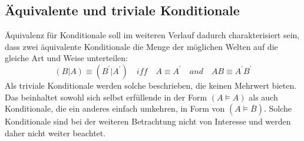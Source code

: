 \documentclass[12pt,a4paper]{article}
\begin{document}
\subsection{Äquivalente und triviale Konditionale}
Äquivalenz für Konditionale soll im weiteren Verlauf dadurch charakterisiert sein, dass zwei äquivalente Konditionale die Menge der möglichen Welten auf die gleiche Art und Weise unterteilen:
\begin{equation}
(B|A)\equiv (B^\prime|A^\prime) \quad iff \quad A\equiv A^\prime \quad and \quad AB \equiv A^\prime B^\prime
\end{equation}
Als triviale Konditionale werden solche beschrieben, die keinen Mehrwert bieten. Das beinhaltet sowohl sich selbst erfüllende in der Form $(A \models A)$ als auch Konditionale, die ein anderes einfach umkehren, in Form von $(A \models \overline{B})$. Solche Konditionale sind bei der weiteren Betrachtung nicht von Interesse und werden daher nicht weiter beachtet.
\end{document}
